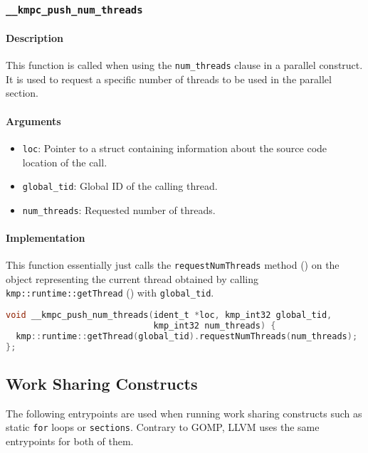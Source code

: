 \subsubsection{\texttt{\_\_kmpc\_push\_num\_threads}}

\paragraph{Description} This function is called when using the \texttt{num\_threads} clause in a
parallel construct. It is used to request a specific number of threads to be used in the parallel
section.

\paragraph{Arguments}
\begin{itemize}
	\item \texttt{loc}: Pointer to a struct containing information about the source code location
	      of the call.
	\item \texttt{global\_tid}: Global ID of the calling thread.
	\item \texttt{num\_threads}: Requested number of threads.
\end{itemize}

\paragraph{Implementation} This function essentially just calls the \texttt{requestNumThreads}
method () on the object representing the current thread obtained by calling
\texttt{kmp::runtime::getThread} () with \texttt{global\_tid}.

\begin{lstlisting}[language=C, caption={\_\_kmpc\_push\_num\_threads}, label={lst:push-num-threads},
                   escapechar=@]
void __kmpc_push_num_threads(ident_t *loc, kmp_int32 global_tid,
                             kmp_int32 num_threads) {
  kmp::runtime::getThread(global_tid).requestNumThreads(num_threads);
};
\end{lstlisting}

\subsection{Work Sharing Constructs}

The following entrypoints are used when running work sharing constructs such as static \texttt{for}
loops or \texttt{sections}. Contrary to GOMP, LLVM uses the same entrypoints for both of them.

